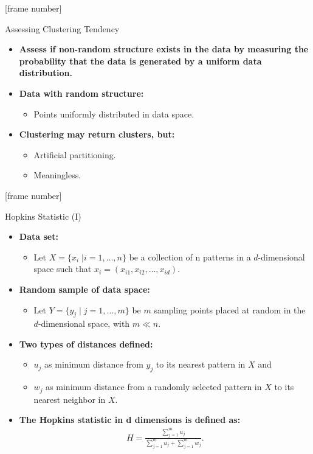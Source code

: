 \documentclass[aspectratio=169,t,xcolor=dvipsnames]{beamer}
\begin{document}
  {
    [frame number]
    \begin{frame}{Assessing Clustering Tendency}
        \begin{itemize}
            \item \textbf{Assess {\color{airforceblue}if non-random structure} exists in the data by measuring the probability that the data is generated by a uniform data distribution.}
            \item \textbf{Data with random structure:}
            \begin{itemize}
                \item Points uniformly distributed in data space.
            \end{itemize}
            \item \textbf{Clustering may return clusters, but:}
            \begin{itemize}
              \item Artificial partitioning.
              \item Meaningless.
            \end{itemize}
        \end{itemize}
    \end{frame}
  }

  {
    [frame number]
    \begin{frame}{Hopkins Statistic (I)}
        \begin{itemize}
          \item \textbf{Data set:}
          \begin{itemize}
            \item Let $X = \{x_i \; \vert i=1,\ldots,n\}$ be a collection of n patterns in a $d$-dimensional space such that $x_i = (x_{i1}, x_{i2}, \ldots, x_{id})$.
          \end{itemize}
          \item \textbf{Random sample of data space:}
          \begin{itemize}
            \item Let $Y = \{y_j \; \vert \; j=1, \ldots, m\}$ be $m$ sampling points placed at random in the $d$-dimensional space, with $m \ll n$.
          \end{itemize}
          \item \textbf{Two types of distances defined:}
          \begin{itemize}
            \item $u_j$ as minimum distance from $y_j$ to its nearest pattern in $X$ and
            \item $w_j$ as minimum distance from a randomly selected pattern in $X$ to its nearest neighbor in $X$.
          \end{itemize}
          \item \textbf{The {\color{airforceblue}Hopkins} statistic in d dimensions is defined as:}
          \begin{align}
            H = \frac{\sum_{j=1}^{m} u_j}{\sum_{j=1}^{m}u_j + \sum_{j=1}^{m} w_j}.
          \end{align}
        \end{itemize}
    \end{frame}
  }
\end{document}
